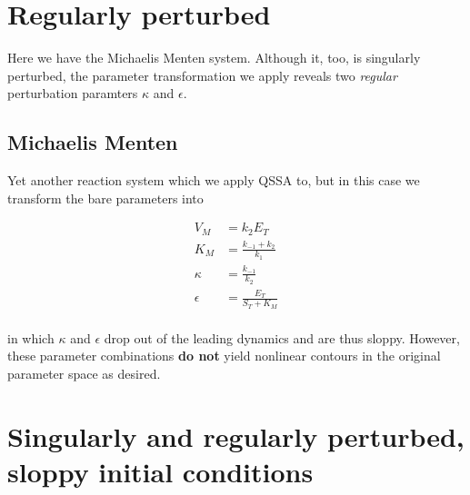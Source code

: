 \documentclass[11pt]{article}
\begin{document}




\section{Regularly perturbed}

Here we have the Michaelis Menten system. Although it, too, is singularly perturbed, the parameter transformation we apply reveals two \textit{regular} perturbation paramters $\kappa$ and $\epsilon$.

\subsection{Michaelis Menten}

Yet another reaction system which we apply QSSA to, but in this case we transform the bare parameters into 

\begin{align*}
  V_M &= k_2 E_T \\
  K_M &= \frac{k_{-1} + k_2}{k_1} \\
  \kappa &= \frac{k_{-1}}{k_2} \\
  \epsilon &= \frac{E_T}{S_T + K_M} \\
\end{align*}

in which $\kappa$ and $\epsilon$ drop out of the leading dynamics and are thus sloppy. However, these parameter combinations \textbf{do not} yield nonlinear contours in the original parameter space as desired.

\section{Singularly and regularly perturbed, sloppy initial conditions}
\end{document}
